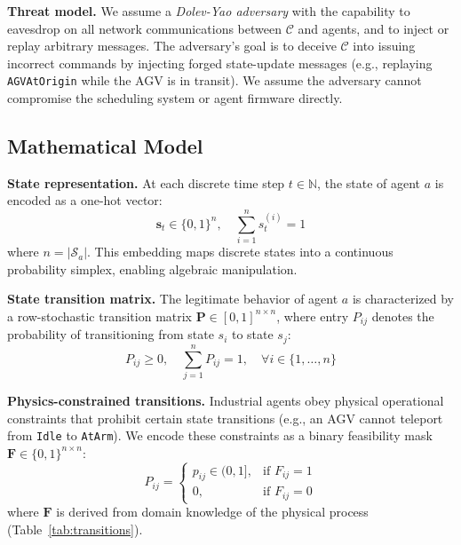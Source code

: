 \documentclass[manuscript,screen,review]{acmart}
\begin{document}
\textbf{Threat model.} We assume a \textit{Dolev-Yao adversary}
with the capability to eavesdrop on all network communications
between $\mathcal{C}$ and agents, and to inject or replay
arbitrary messages. The adversary's goal is to deceive
$\mathcal{C}$ into issuing incorrect commands by injecting
forged state-update messages (e.g., replaying
\texttt{AGVAtOrigin} while the AGV is in transit). We assume
the adversary cannot compromise the scheduling system or
agent firmware directly.

\subsection{Mathematical Model}
\label{subsec:mathmodel}

\textbf{State representation.} At each discrete time step
$t \in \mathbb{N}$, the state of agent $a$ is encoded as a
one-hot vector:
\begin{equation}
  \mathbf{s}_t \in \{0,1\}^{n}, \quad \sum_{i=1}^{n} s_t^{(i)} = 1
  \label{eq:onehot}
\end{equation}
where $n = |\mathcal{S}_a|$. This embedding maps discrete
states into a continuous probability simplex, enabling
algebraic manipulation.

\textbf{State transition matrix.} The legitimate behavior of
agent $a$ is characterized by a row-stochastic transition
matrix $\mathbf{P} \in [0,1]^{n \times n}$, where entry
$P_{ij}$ denotes the probability of transitioning from state
$s_i$ to state $s_j$:
\begin{equation}
  P_{ij} \geq 0, \quad \sum_{j=1}^{n} P_{ij} = 1,
  \quad \forall i \in \{1,\ldots,n\}
  \label{eq:stochastic}
\end{equation}

\textbf{Physics-constrained transitions.} Industrial agents
obey physical operational constraints that prohibit certain
state transitions (e.g., an AGV cannot teleport from
\texttt{Idle} to \texttt{AtArm}). We encode these constraints
as a binary feasibility mask $\mathbf{F} \in \{0,1\}^{n\times n}$:
\begin{equation}
  P_{ij} =
  \begin{cases}
    p_{ij} \in (0,1], & \text{if } F_{ij} = 1 \\
    0, & \text{if } F_{ij} = 0
  \end{cases}
  \label{eq:constrained_P}
\end{equation}
where $\mathbf{F}$ is derived from domain knowledge of the
physical process (Table~\ref{tab:transitions}).
\end{document}
